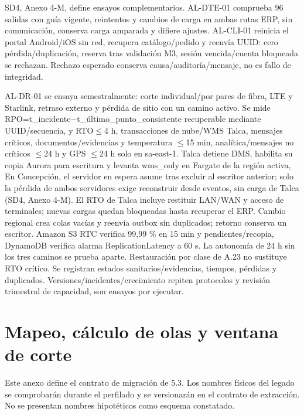 

SD4, Anexo 4-M, define ensayos complementarios. AL-DTE-01 comprueba 96 salidas con guía vigente, reintentos y cambios de carga en ambas rutas ERP, sin comunicación, conserva carga amparada y difiere ajustes. AL-CLI-01 reinicia el portal Android/iOS sin red, recupera catálogo/pedido y reenvía UUID: cero pérdida/duplicación, reserva tras validación M3, sesión vencida/cuenta bloqueada se rechazan. Rechazo esperado conserva causa/auditoría/mensaje, no es fallo de integridad.

AL-DR-01 se ensaya semestralmente: corte individual/por pares de fibra, LTE y Starlink, retraso externo y pérdida de sitio con un camino activo. Se mide RPO=t\_incidente\ensuremath{-}t\_último\_punto\_consistente recuperable mediante UUID/secuencia, y RTO\ensuremath{\leq}4 h, transacciones de nube/WMS Talca, mensajes críticos, documentos/evidencias y temperatura \ensuremath{\leq}15 min, analítica/mensajes no críticos \ensuremath{\leq}24 h y GPS \ensuremath{\leq}24 h solo en sa-east-1. Talca detiene DMS, habilita su copia Aurora para escritura y levanta wms\_only en Fargate de la región activa, En Concepción, el servidor en espera asume tras excluir al escritor anterior; solo la pérdida de ambos servidores exige reconstruir desde eventos, sin carga de Talca (SD4, Anexo 4-M). El RTO de Talca incluye restituir LAN/WAN y acceso de terminales; nuevas cargas quedan bloqueadas hasta recuperar el ERP. Cambio regional crea colas vacías y reenvía outbox sin duplicados; retorno conserva un escritor. Amazon S3 RTC verifica 99,99 \% en 15 min y pendientes/recopia, DynamoDB verifica alarma ReplicationLatency a 60 s. La autonomía de 24 h sin los tres caminos se prueba aparte. Restauración por clase de A.23 no sustituye RTO crítico. Se registran estados sanitarios/evidencias, tiempos, pérdidas y duplicados. Versiones/incidentes/crecimiento repiten protocolos y revisión trimestral de capacidad, son ensayos por ejecutar.

\section{Mapeo, cálculo de olas y ventana de corte}
\label{anexo-5k}

Este anexo define el contrato de migración de 5.3. Los nombres físicos del legado se comprobarán durante el perfilado y se versionarán en el contrato de extracción. No se presentan nombres hipotéticos como esquema constatado.

